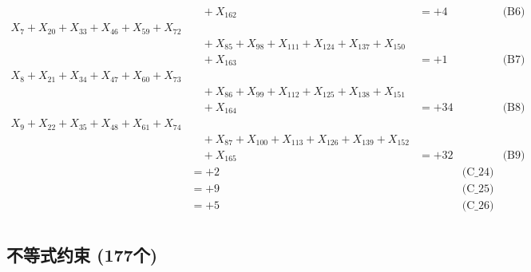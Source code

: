 \documentclass[a4paper,10pt]{article}
\begin{document}
{\begin{align}
&\quad  + X_{162} &= +4 && \text{(B6)} \\
\allowbreak
X_{7} + X_{20} + X_{33} + X_{46} + X_{59} + X_{72} \\[0.1ex]
&\quad  + X_{85} + X_{98} + X_{111} + X_{124} + X_{137} + X_{150} \\[0.1ex]
&\quad  + X_{163} &= +1 && \text{(B7)} \\
X_{8} + X_{21} + X_{34} + X_{47} + X_{60} + X_{73} \\[0.1ex]
&\quad  + X_{86} + X_{99} + X_{112} + X_{125} + X_{138} + X_{151} \\[0.1ex]
&\quad  + X_{164} &= +34 && \text{(B8)} \\
X_{9} + X_{22} + X_{35} + X_{48} + X_{61} + X_{74} \\[0.1ex]
&\quad  + X_{87} + X_{100} + X_{113} + X_{126} + X_{139} + X_{152} \\[0.1ex]
&\quad  + X_{165} &= +32 && \text{(B9)} \\
 &= +2 && \text{(C\_24)} \\
 &= +9 && \text{(C\_25)} \\
\allowbreak
 &= +5 && \text{(C\_26)} \\
\end{align}
}

\subsection{不等式约束 (177个)}
\end{document}
